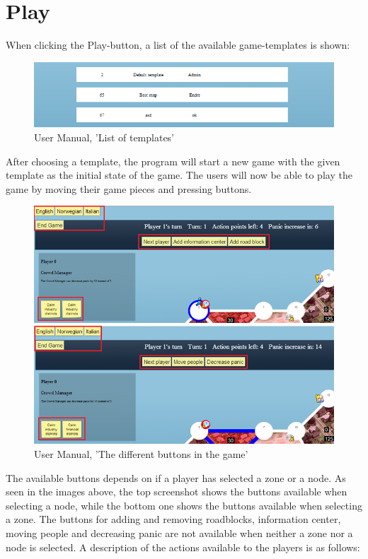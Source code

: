 \section{Play}

When clicking the Play-button, a list of the available game-templates is shown:

\begin{figure}[H]
  \centering
    \includegraphics[width=1.0\textwidth]{img/gamelist.png}
  \caption{User Manual, 'List of templates'}
  \label{fig:gamelist}
\end{figure}

\noindent After choosing a template, the program will start a new game with the given template as the initial state of the game. The users will now be able to play the game by moving their game pieces and pressing buttons.

\begin{figure}[H]
  \centering
    \includegraphics[width=1.0\textwidth]{img/buttonsbothred.png}
  \caption{User Manual, 'The different buttons in the game'}
  \label{fig:buttons}
\end{figure}

\noindent The available buttons depends on if a player has selected a zone or a node. As seen in the images above, the top screenshot shows the buttons available when selecting a node, while the bottom one shows the buttons available when selecting a zone. The buttons for adding and removing roadblocks, information center, moving people and decreasing panic are not available when neither a zone nor a node is selected. A description of the actions available to the players is as follows:

